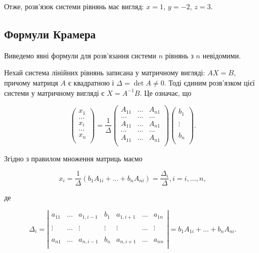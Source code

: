 Отже, розв’язок системи рівнянь має вигляд: $x = 1$, $y = -2$, $z = 3$.

\subsection{Формули Крамера}

Виведемо явні формули для розв’язання системи $n$ рівнянь з $n$ невідомими.

Нехай система лінійних рівнянь записана у матричному вигляді: $A X = B$,
причому матриця $A$ є квадратною і $\Delta = \det A \neq 0$. Тоді єдиним розв’язком цієї
системи у матричному вигляді є $X = A^{-1} B$. Це означає, що

$$\begin{pmatrix}
	x_1 \\
	... \\
	x_i \\
	... \\
	x_n \\
\end{pmatrix}
= \dfrac{1}{\Delta} \begin{pmatrix}
	A_{11} & ... & A_{n1} \\
	...    & ... & ...    \\
	A_{11} & ... & A_{n1} \\
	...    & ... & ...    \\
	A_{11} & ... & A_{n1} \\
\end{pmatrix} \begin{pmatrix}
	b_1    \\
	~      \\
	\vdots \\
	~      \\
	b_n    \\
\end{pmatrix}.$$



Згідно з правилом множення матриць маємо

$$x_i = \dfrac{1}{\Delta}(b_1 A_{1i} + ... + b_n A_{ni}) = \dfrac{\Delta_i}{\Delta}, i = i, ..., n,$$

де

$$\Delta_i = \left| \begin{matrix}
	a_{11} & ... & a_{1, i-1} & b_1    & a_{1,i+1} & ... & a_{1 n} \\
	& & & & & & \\
	\vdots & ... & \vdots     & \vdots & \vdots & ... & \vdots     \\
	& & & & & & \\	
	a_{n1} & ... & a_{n, i-1} & b_n    & a_{n,i+1} & ... & a_{n n} \\
\end{matrix} \right| = b_1 A_{1i} + ... + b_n A_{ni}.$$

